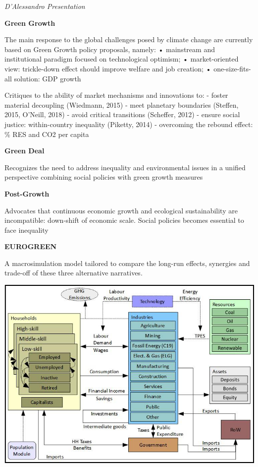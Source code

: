 \documentclass[
]{book}
\begin{document}
\emph{D'Alessandro Presentation}

\textbf{Green Growth}

The main response to the global challenges posed by climate
change are currently based on Green Growth policy proposals,
namely:
• mainstream and institutional paradigm focused on technological
optimism;
• market-oriented view: trickle-down effect should improve welfare
and job creation;
• one-size-fits-all solution: GDP growth

Critiques to the ability of market mechanisms and innovations to:
- foster material decoupling (Wiedmann, 2015)
- meet planetary boundaries (Steffen, 2015, O'Neill, 2018)
- avoid critical transitions (Scheffer, 2012)
- ensure social justice: within-country inequality (Piketty, 2014)
- overcoming the rebound effect: \% RES and CO2 per capita

\textbf{Green Deal}

Recognizes the need to address inequality and environmental
issues in a unified perspective combining social policies with
green growth measures

\textbf{Post-Growth}

Advocates that continuous economic growth and ecological
sustainability are incompatible:
down-shift of economic scale.
Social policies becomes essential to face inequality

\textbf{EUROGREEN}

A macrosimulation model tailored
to compare the long-run effects, synergies and trade-off of
these three alternative narratives.

\includegraphics{fig/eurogreen.png}
\end{document}
